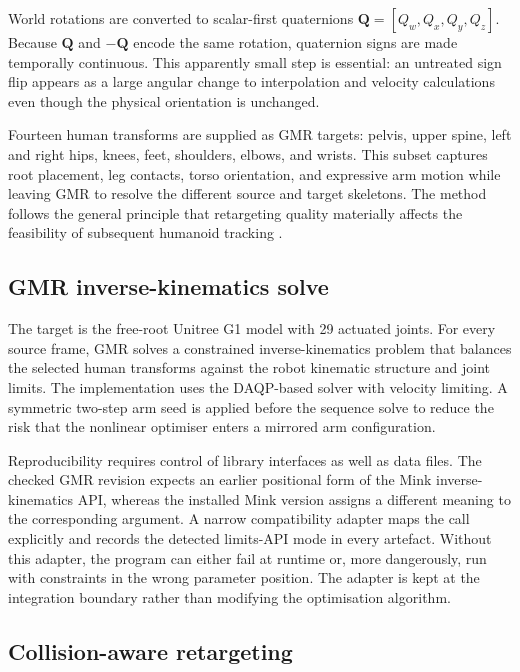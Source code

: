 World rotations are converted to scalar-first quaternions
$\mathbf{Q}=[Q_w,Q_x,Q_y,Q_z]$. Because $\mathbf{Q}$ and $-\mathbf{Q}$ encode the same
rotation, quaternion signs are made temporally continuous. This apparently
small step is essential: an untreated sign flip appears as a large angular
change to interpolation and velocity calculations even though the physical
orientation is unchanged.

Fourteen human transforms are supplied as GMR targets: pelvis, upper spine,
left and right hips, knees, feet, shoulders, elbows, and wrists. This subset
captures root placement, leg contacts, torso orientation, and expressive arm
motion while leaving GMR to resolve the different source and target skeletons.
The method follows the general principle that retargeting quality materially
affects the feasibility of subsequent humanoid tracking
\cite{araujo2025retargeting}.

\subsection{GMR inverse-kinematics solve}
\label{subsec:gmr_solve}

The target is the free-root Unitree G1 model with 29 actuated joints. For every
source frame, GMR solves a constrained inverse-kinematics problem that balances
the selected human transforms against the robot kinematic structure and joint
limits. The implementation uses the DAQP-based solver with velocity limiting.
A symmetric two-step arm seed is applied before the sequence solve to reduce
the risk that the nonlinear optimiser enters a mirrored arm configuration.

Reproducibility requires control of library interfaces as well as data files.
The checked GMR revision expects an earlier positional form of the Mink
inverse-kinematics API, whereas the installed Mink version assigns a different
meaning to the corresponding argument. A narrow compatibility adapter maps the
call explicitly and records the detected limits-API mode in every artefact.
Without this adapter, the program can either fail at runtime or, more
dangerously, run with constraints in the wrong parameter position. The adapter
is kept at the integration boundary rather than modifying the optimisation
algorithm.

\subsection{Collision-aware retargeting}
\label{subsec:collision_retargeting}

